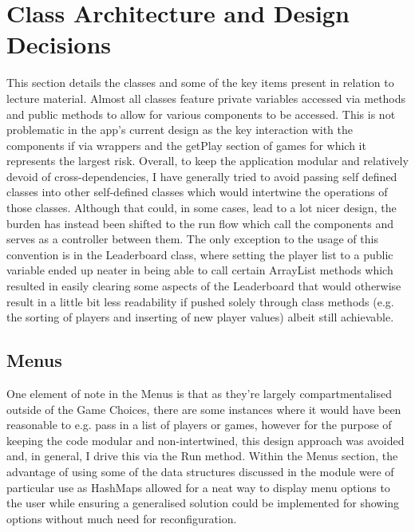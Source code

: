 \documentclass{scrreprt}
\begin{document}
\section{Class Architecture and Design Decisions}\label{Classes}
This section details the classes and some of the key items present in relation to lecture material. Almost all classes feature private variables accessed via methods and public methods to allow for various components to be accessed. This is not problematic in the app's current design as the key interaction with the components if via wrappers and the getPlay section of games for which it represents the largest risk. Overall, to keep the application modular and relatively devoid of cross-dependencies, I have generally tried to avoid passing self defined classes into other self-defined classes which would intertwine the operations of those classes. Although that could, in some cases, lead to a lot nicer design, the burden has instead been shifted to the run flow which call the components and serves as a controller between them. The only exception to the usage of this convention is in the Leaderboard class, where setting the player list to a public variable ended up neater in being able to call certain ArrayList methods which resulted in easily clearing some aspects of the Leaderboard that would otherwise result in a little bit less readability if pushed solely through class methods (e.g. the sorting of players and inserting of new player values) albeit still achievable.

\subsection{Menus}
One element of note in the Menus is that as they're largely compartmentalised outside of the Game Choices, there are some instances where it would have been reasonable to e.g. pass in a list of players or games, however for the purpose of keeping the code modular and non-intertwined, this design approach was avoided and, in general, I drive this via the Run method. Within the Menus section, the advantage of using some of the data structures discussed in the module were of particular use as HashMaps allowed for a neat way to display menu options to the user while ensuring a generalised solution could be implemented for showing options without much need for reconfiguration.
\end{document}
